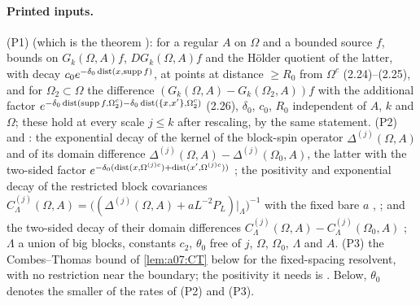 \paragraph{Printed inputs.} \textup{(P1)} \cite[Prop.~2.1, (2.24)--(2.26)]{Ba1} (which is the theorem \cite[(1.9)--(1.12)]{Ba4}): for a regular $A$ on $\Omega$ and a bounded source $f$, bounds on $G_k(\Omega,A)f$, $DG_k(\Omega,A)f$ and the H\"older quotient of the latter, with decay $c_0e^{-\delta_0\operatorname{dist}(x,\operatorname{supp} f)}$, at points at distance $\ge R_0$ from $\Omega^c$ (2.24)--(2.25), and for $\Omega_2\subset\Omega$ the difference $(G_k(\Omega,A)-G_k(\Omega_2,A))f$ with the additional factor $e^{-\delta_0\operatorname{dist}(\operatorname{supp} f,\Omega_2^c)-\delta_0\operatorname{dist}(\{x,x'\},\Omega_2^c)}$ (2.26), $\delta_0$, $c_0$, $R_0$ independent of $A$, $k$ and $\Omega$; these hold at every scale $j\le k$ after rescaling, by the same statement. \textup{(P2)} \cite[Props.~2.2--2.3]{Ba1} and \cite[(1.13)--(1.20)]{Ba4}: the exponential decay of the kernel of the block-spin operator $\Delta^{(j)}(\Omega,A)$ and of its domain difference $\Delta^{(j)}(\Omega,A)-\Delta^{(j)}(\Omega_0,A)$, the latter with the two-sided factor $e^{-\delta_0(\operatorname{dist}(x,\Omega^{(j)c})+\operatorname{dist}(x',\Omega^{(j)c}))}$ \cite[(2.27)--(2.29)]{Ba1}; the positivity and exponential decay of the restricted block covariances $C^{(j)}_\Lambda(\Omega,A)=\big((\Delta^{(j)}(\Omega,A)+aL^{-2}P_L)|_\Lambda\big)^{-1}$ with the fixed bare $a$ \cite[(2.31)--(2.34)]{Ba1}, \cite[(1.13), (1.15)--(1.16)]{Ba4}; and the two-sided decay of their domain differences $C^{(j)}_\Lambda(\Omega,A)-C^{(j)}_\Lambda(\Omega_0,A)$ \cite[(1.19)--(1.20)]{Ba4}; $\Lambda$ a union of big blocks, constants $c_2$, $\theta_0$ free of $j$, $\Omega$, $\Omega_0$, $\Lambda$ and $A$. \textup{(P3)} the Combes--Thomas bound of \cref{lem:a07:CT} below for the fixed-spacing resolvent, with no restriction near the boundary; the positivity it needs is \cite[(1.8)]{Ba4}. Below, $\theta_0$ denotes the smaller of the rates of \textup{(P2)} and \textup{(P3)}.

